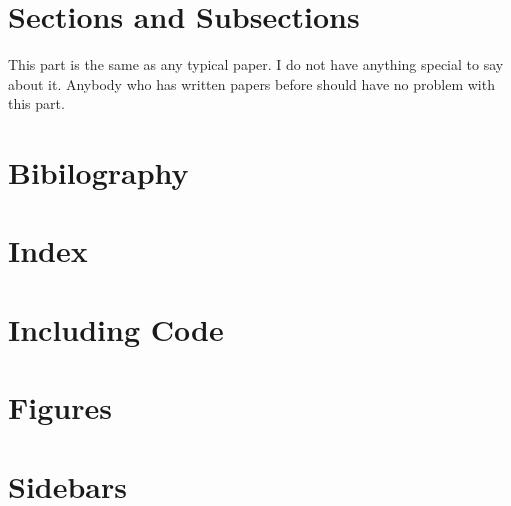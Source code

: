 \section{Sections and Subsections} 

This part is the same as any typical paper. I do not have anything special
to say about it. Anybody who has written papers before should have no problem with 
this part.




\section{Bibilography}




\section{Index}




\section{Including Code}




\section{Figures}




\section{Sidebars} 













